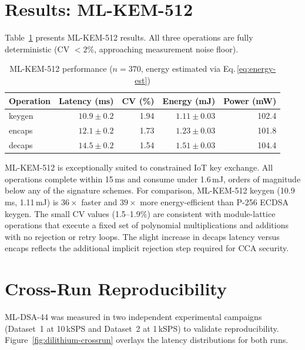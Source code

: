 \documentclass[iicol]{sn-jnl}
\begin{document}
\section{Results: ML-KEM-512}
\label{sec:results-kem}

Table~\ref{tab:kem} presents ML-KEM-512 results.
All three operations are fully deterministic (CV $< 2$\%, approaching
measurement noise floor).

\begin{table}[t]
\caption{ML-KEM-512 performance ($n = 370$, energy estimated via
  Eq.\,\ref{eq:energy-est})}
\label{tab:kem}
\centering
\small
\begin{tabular}{@{}lrrrr@{}}
\toprule
\textbf{Operation}
  & \textbf{Latency (ms)}
  & \textbf{CV (\%)}
  & \textbf{Energy (mJ)}
  & \textbf{Power (mW)} \\
\midrule
keygen &  $10.9 \pm 0.2$ & 1.94 & $1.11 \pm 0.03$ & 102.4 \\
encaps &  $12.1 \pm 0.2$ & 1.73 & $1.23 \pm 0.03$ & 101.8 \\
decaps &  $14.5 \pm 0.2$ & 1.54 & $1.51 \pm 0.03$ & 104.4 \\
\bottomrule
\end{tabular}
\end{table}

ML-KEM-512 is exceptionally suited to constrained IoT key exchange.
All operations complete within 15\,ms and consume under 1.6\,mJ,
orders of magnitude below any of the signature schemes.
For comparison, ML-KEM-512 keygen (10.9\,ms, 1.11\,mJ) is $36\times$
faster and $39\times$ more energy-efficient than P-256 ECDSA keygen.
The small CV values (1.5--1.9\%) are consistent with
module-lattice operations that execute a fixed set of polynomial multiplications
and additions with no rejection or retry loops.
The slight increase in decaps latency versus encaps reflects the additional
implicit rejection step required for CCA security.

\section{Cross-Run Reproducibility}
\label{sec:crossrun}

ML-DSA-44 was measured in two independent experimental campaigns
(Dataset~1 at 10\,kSPS and Dataset~2 at 1\,kSPS) to validate
reproducibility.
Figure~\ref{fig:dilithium-crossrun} overlays the latency distributions
for both runs.
\end{document}
